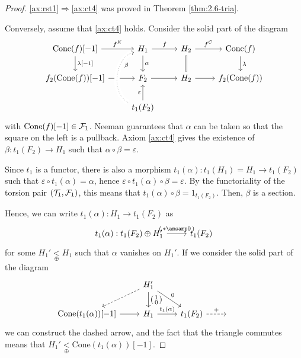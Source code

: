 \begin{proof}
  \ref{ax:rst1}$\Rightarrow$\ref{ax:ct4} was proved in Theorem \ref{thm:2.6-tria}.

  Conversely, assume that
  \ref{ax:ct4} holds. Consider the solid part of the diagram
  \begin{equation*}
    \begin{tikzcd}
      \mathrm{Cone}(f)[-1]\arrow{r}{f^K}\arrow{d}{\lambda[-1]}
        & H_1\arrow{r}{f}\arrow{d}{\alpha}
          & H_2\arrow{r}{f^C}\arrow[equal]{d}
            & \mathrm{Cone}(f)\arrow{d}{\lambda}\\
       f_2(\mathrm{Cone}(f))[-1]\arrow{r}
        & F_2\arrow{r}
          & H_2\arrow{r}
            &  f_2(\mathrm{Cone}(f))\\
        &  t_1(F_2)\arrow{u}{\varepsilon}\arrow[dotted, crossing over, bend left=70]{uu}[near end,']{\beta}
        & &
    \end{tikzcd}
  \end{equation*}
  with $\mathrm{Cone}(f)[-1]\in\mathcal{F}_1$. Neeman \cite[Lemma~1.4.3]{Nee01} guarantees
  that $\alpha$ can be taken so that the square on the left is a pullback. Axiom \ref{ax:ct4}
  gives the existence of $\beta: t_1(F_2)\to H_1$ such that $\alpha\circ\beta=\varepsilon$.

  Since $ t_1$ is a functor, there is also a morphism
  $ t_1(\alpha): t_1(H_1)=H_1\to  t_1(F_2)$ such that
  $\varepsilon\circ t_1(\alpha)=\alpha$, hence
  $\varepsilon\circ t_1(\alpha)\circ\beta = \varepsilon$. By the functoriality of
  the torsion pair $(\mathcal{T}_1,\mathcal{F}_1)$, this means that
  $ t_1(\alpha)\circ\beta=1_{ t_1(F_2)}$. Then, $\beta$ is a section.

  Hence, we can write $ t_1(\alpha):H_1\to  t_1(F_2)$
  as
  \begin{equation*}
    \begin{tikzcd}
       t_1(\alpha): t_1(F_2)\oplus H_1'
      \arrow{r}{
          \begin{psmallmatrix}
            \ast \amsamp 0
          \end{psmallmatrix}
          }
        &  t_1(F_2)
    \end{tikzcd}
  \end{equation*}
  for some $H_1'\underset{\oplus}{<} H_1$ such that
  $\alpha$ vanishes on $H_1'$. If we consider the solid part of the diagram
  \begin{equation*}
    \begin{tikzcd}
      & H_1'\arrow[dashed]{dl}
      \arrow{d}{
        \begin{psmallmatrix}
          1 \\ 0
        \end{psmallmatrix}
      }\arrow{dr}{0}
        & & &\\
      \mathrm{Cone}( t_1(\alpha))[-1]\arrow{r}
        & H_1\arrow{r}{ t_1(\alpha)}
          &  t_1(F_2)\arrow[dashed]{r}{+}
            & {}
    \end{tikzcd}
  \end{equation*}
  we can construct the dashed arrow, and the fact that the triangle commutes means
  that $H_1'\underset{\oplus}{<}\mathrm{Cone}( t_1(\alpha))[-1]$.


\end{proof}
